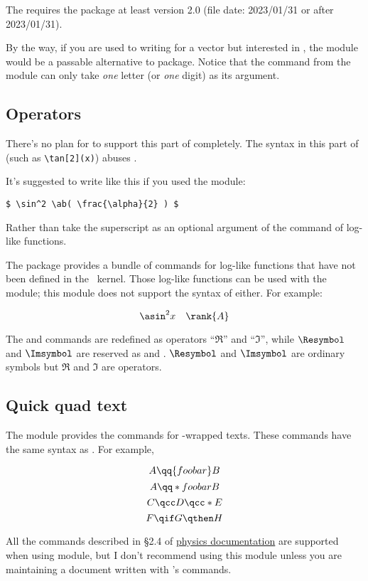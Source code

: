 \documentclass[11pt,letterpaper]{article}
\begin{document}
The  requires the  package at least
version 2.0 (file date: 2023/01/31 or after 2023/01/31).

By the way, if you are used to writing  for a vector but interested in
, the  module would be a passable
alternative to  package. Notice that the  command from the
 module can only take \emph{one} letter (or \emph{one} digit)
as its argument.

\subsection{Operators}
There's no plan for  to support this part of 
completely. The syntax in this part of  (such as \verb|\tan[2](x)|)
abuses .

It's suggested to write like this if you used the  module:
\begin{Verbatim}[fontsize=\small]
$ \sin^2 \ab( \frac{\alpha}{2} ) $
\end{Verbatim}
Rather than take the superscript as an optional argument of the command of
log-like functions.

The  package provides a bundle of commands for log-like functions
that have not been defined in the \LaTeXe\ kernel. Those log-like functions
can be used with the  module; this module does not support
the syntax of  either. For example:
\begin{example}
\[ \asin^2 x \quad \rank \{ A \} \]
\end{example}
The  and  commands are redefined as operators ``$\Re$'' and
``$\Im$'', while $\Resymbol$ and $\Imsymbol$ are reserved as  and
. $\Resymbol$ and $\Imsymbol$ are ordinary symbols but $\Re$ and
$\Im$ are operators.

\subsection{Quick quad text}\label{subsec:qtext}
The  module provides the  commands
for -wrapped texts. These commands have the same syntax as
. For example,
\begin{example}
\[ A \qq {foo bar} B \]
\[ A \qq*{foo bar} B \]
\[ C \qcc D \qcc*  E \]
\[ F \qif G \qthen H \]
\end{example}
All the commands described in \S2.4 of
\href{http://mirrors.ctan.org/macros/latex/contrib/physics/physics.pdf}%
{\textsf{physics} documentation} are supported when using 
module, but I don't recommend using this module unless you are maintaining a
document written with 's  commands.
\end{document}
